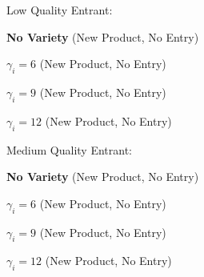 \documentclass{article}
\begin{document}
\clearpage

Low Quality Entrant:

\textbf{No Variety} (New Product, No Entry)



\textbf{$\gamma_i=6$} (New Product, No Entry)



\textbf{$\gamma_i=9$} (New Product, No Entry)



\textbf{$\gamma_i=12$} (New Product, No Entry)



\clearpage

Medium Quality Entrant:

\textbf{No Variety} (New Product, No Entry)



\textbf{$\gamma_i=6$} (New Product, No Entry)



\textbf{$\gamma_i=9$} (New Product, No Entry)



\textbf{$\gamma_i=12$} (New Product, No Entry)


\end{document}

